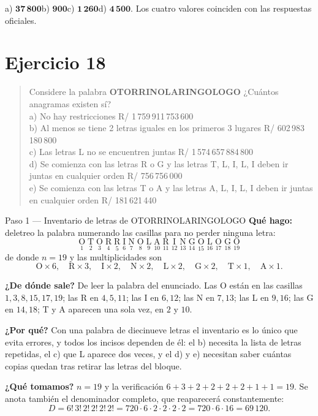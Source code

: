 \documentclass[11pt]{article}
\begin{document}
\begin{resp}
a) $\mathbf{37\,800}$\quad b) $\mathbf{900}$\quad c) $\mathbf{1\,260}$\quad d) $\mathbf{4\,500}$.
Los cuatro valores coinciden con las respuestas oficiales.
\end{resp}

\section*{Ejercicio 18}

\begin{quote}
Considere la palabra \textbf{OTORRINOLARINGOLOGO} ¿Cuántos anagramas existen sí?\\
a) No hay restricciones \hfill R/ 1\,759\,911\,753\,600\\
b) Al menos se tiene 2 letras iguales en los primeros 3 lugares \hfill R/ 602\,983\,180\,800\\
c) Las letras L no se encuentren juntas \hfill R/ 1\,574\,657\,884\,800\\
d) Se comienza con las letras R o G y las letras T, L, I, L, I deben ir juntas en cualquier orden
\hfill R/ 756\,756\,000\\
e) Se comienza con las letras T o A y las letras A, L, I, L, I deben ir juntas en cualquier orden
\hfill R/ 181\,621\,440
\end{quote}

\begin{paso}{Paso 1 --- Inventario de letras de OTORRINOLARINGOLOGO}
\textbf{Qué hago:} deletreo la palabra numerando las casillas para no perder ninguna letra:
\[
\underset{1}{\text{O}}\;\underset{2}{\text{T}}\;\underset{3}{\text{O}}\;\underset{4}{\text{R}}\;\underset{5}{\text{R}}\;
\underset{6}{\text{I}}\;\underset{7}{\text{N}}\;\underset{8}{\text{O}}\;\underset{9}{\text{L}}\;\underset{10}{\text{A}}\;
\underset{11}{\text{R}}\;\underset{12}{\text{I}}\;\underset{13}{\text{N}}\;\underset{14}{\text{G}}\;\underset{15}{\text{O}}\;
\underset{16}{\text{L}}\;\underset{17}{\text{O}}\;\underset{18}{\text{G}}\;\underset{19}{\text{O}}
\]
de donde $n=19$ y las multiplicidades son
\[
\text{O}\times6,\quad \text{R}\times3,\quad \text{I}\times2,\quad \text{N}\times2,\quad
\text{L}\times2,\quad \text{G}\times2,\quad \text{T}\times1,\quad \text{A}\times1 .
\]

\textbf{¿De dónde sale?} De leer la palabra del enunciado. Las O están en las casillas
$1,3,8,15,17,19$; las R en $4,5,11$; las I en $6,12$; las N en $7,13$; las L en $9,16$; las G en $14,18$;
T y A aparecen una sola vez, en $2$ y $10$.

\textbf{¿Por qué?} Con una palabra de diecinueve letras el inventario es lo único que evita errores, y
todos los incisos dependen de él: el b) necesita la lista de letras repetidas, el c) que L aparece dos
veces, y el d) y e) necesitan saber cuántas copias quedan tras retirar las letras del bloque.

\textbf{¿Qué tomamos?} $n=19$ y la verificación $6+3+2+2+2+2+1+1=19$. Se anota también el denominador
completo, que reaparecerá constantemente:
\[
D=6!\,3!\,2!\,2!\,2!\,2!=720\cdot6\cdot2\cdot2\cdot2\cdot2=720\cdot6\cdot16=69\,120 .
\]
\end{paso}
\end{document}
